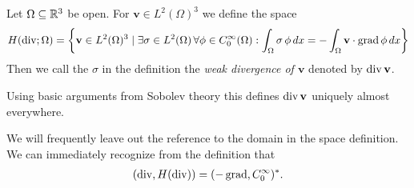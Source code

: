 \documentclass[../main.tex]{subfiles}
\begin{document}
\begin{definition}
    Let $\Omega \subseteq \mathbb{R}^3$ be open. For $\mathbf{v} \in L^2(\Omega)^3$ we  
    define the space
    \begin{align*}
        H(\operatorname{div};\Omega) = \left\{ \mathbf{v} \in L^2(\Omega)^3 \mid
            \exists \sigma \in L^2(\Omega)\, \forall \phi \in C_0^\infty(\Omega) :  
            \int_\Omega \sigma \, \phi \, dx = -\int_\Omega \mathbf{v} \cdot \operatorname{grad} \phi \, dx \right\}
    \end{align*}
    Then we call the $\sigma$ in the definition the \textit{weak divergence of $\mathbf{v}$}
    denoted by $\operatorname{div} \mathbf{v}$.
\end{definition}
Using basic arguments from Sobolev theory this defines $\operatorname{div} \mathbf{v}$ 
uniquely almost everywhere. 


We will frequently leave out the reference to the domain in the space definition.
We can immediately recognize from the definition that 
\begin{align}
    (\operatorname{div}, H(\operatorname{div})) = (-\operatorname{grad}, C_0^\infty)^*. \label{eq:adjoint_grad_c0inf}
\end{align}
\end{document}
